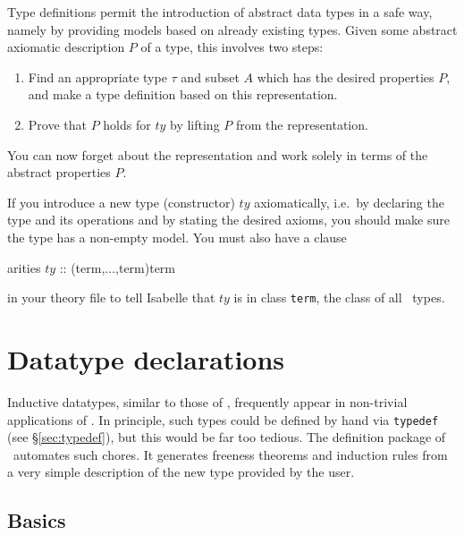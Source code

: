 Type definitions permit the introduction of abstract data types in a safe
way, namely by providing models based on already existing types.  Given some
abstract axiomatic description $P$ of a type, this involves two steps:
\begin{enumerate}
\item Find an appropriate type $\tau$ and subset $A$ which has the desired
  properties $P$, and make a type definition based on this representation.
\item Prove that $P$ holds for $ty$ by lifting $P$ from the representation.
\end{enumerate}
You can now forget about the representation and work solely in terms of the
abstract properties $P$.

\begin{warn}
If you introduce a new type (constructor) $ty$ axiomatically, i.e.\ by
declaring the type and its operations and by stating the desired axioms, you
should make sure the type has a non-empty model.  You must also have a clause
\par
\begin{ttbox}
arities \(ty\) :: (term,\thinspace\(\dots\),{\thinspace}term){\thinspace}term
\end{ttbox}
in your theory file to tell Isabelle that $ty$ is in class \texttt{term}, the
class of all \HOL\ types.
\end{warn}

\section{Datatype declarations}
\label{sec:HOL:datatype}

Inductive datatypes, similar to those of \ML, frequently appear in
non-trivial applications of \HOL.  In principle, such types could be
defined by hand via \texttt{typedef} (see \S\ref{sec:typedef}), but
this would be far too tedious.  The  definition
package of \HOL\ automates such chores.  It generates freeness theorems
and induction rules from a very simple description of the new type
provided by the user.


\subsection{Basics}
\label{subsec:datatype:basics}

